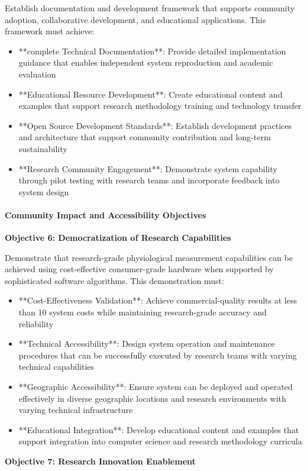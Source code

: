 \documentclass[11pt,a4paper]{article}
\begin{document}
Establish documentation and development framework that supports community
adoption, collaborative development, and
educational applications. This framework must achieve:

\begin{itemize}
\item **complete Technical Documentation**: Provide detailed implementation
guidance that enables independent system
  reproduction and academic evaluation
\item **Educational Resource Development**: Create educational content and
examples that support research methodology
  training and technology transfer
\item **Open Source Development Standards**: Establish development practices and
architecture that support community
  contribution and long-term sustainability
\item **Research Community Engagement**: Demonstrate system capability through
pilot testing with research teams and
  incorporate feedback into system design

\end{itemize}
\paragraph{Community Impact and Accessibility Objectives}

\textbf{Objective 6: Democratization of Research Capabilities}

Demonstrate that research-grade physiological measurement capabilities can be
achieved using cost-effective
consumer-grade hardware when supported by sophisticated software algorithms.
This demonstration must:

\begin{itemize}
\item **Cost-Effectiveness Validation**: Achieve commercial-quality results at
less than 10%
  system costs while maintaining research-grade accuracy and reliability
\item **Technical Accessibility**: Design system operation and maintenance
procedures that can be successfully executed by
  research teams with varying technical capabilities
\item **Geographic Accessibility**: Ensure system can be deployed and operated
effectively in diverse geographic locations
  and research environments with varying technical infrastructure
\item **Educational Integration**: Develop educational content and examples that
support integration into computer science
  and research methodology curricula

\end{itemize}
\textbf{Objective 7: Research Innovation Enablement}
\end{document}
